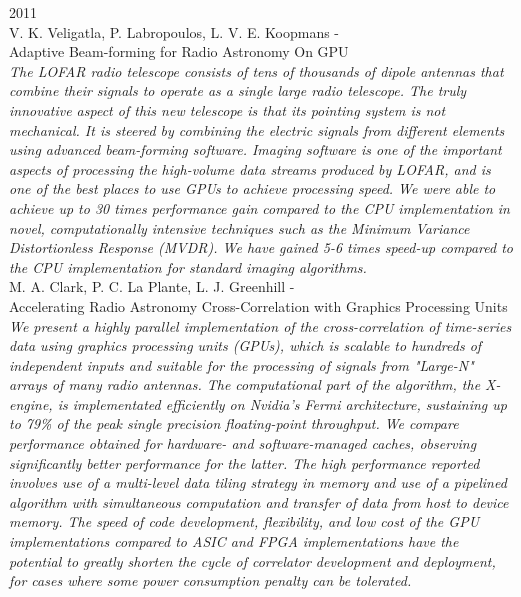 \noindent
{\large 2011}\\
\noindent
{\large V. K. Veligatla, P. Labropoulos, L. V. E. Koopmans - \hfill \\ Adaptive Beam-forming for Radio Astronomy On GPU }\\
\indent \textit{The LOFAR radio telescope consists of tens of thousands of dipole antennas that combine
their signals to operate as a single large radio telescope. The truly innovative aspect of
this new telescope is that its pointing system is not mechanical. It is steered by combining
the electric signals from different elements using advanced beam-forming software. Imaging
software is one of the important aspects of processing the high-volume data streams
produced by LOFAR, and is one of the best places to use GPUs to achieve processing
speed. We were able to achieve up to 30 times performance gain compared to the CPU
implementation in novel, computationally intensive techniques such as the Minimum Variance
Distortionless Response (MVDR). We have gained 5-6 times speed-up compared to
the CPU implementation for standard imaging algorithms.
}\\

\noindent
{\large M. A. Clark, P. C. La Plante, L. J. Greenhill - \hfill \\ Accelerating Radio Astronomy Cross-Correlation with Graphics Processing Units }\\
\indent \textit{We present a highly parallel implementation of the cross-correlation of time-series data using graphics processing units (GPUs), which is scalable to hundreds of independent inputs and suitable for the processing of signals from "Large-N" arrays of many radio antennas. The computational part of the algorithm, the X-engine, is implementated efficiently on Nvidia's Fermi architecture, sustaining up to 79\% of the peak single precision floating-point throughput. We compare performance obtained for hardware- and software-managed caches, observing significantly better performance for the latter. The high performance reported involves use of a multi-level data tiling strategy in memory and use of a pipelined algorithm with simultaneous computation and transfer of data from host to device memory. The speed of code development, flexibility, and low cost of the GPU implementations compared to ASIC and FPGA implementations have the potential to greatly shorten the cycle of correlator development and deployment, for cases where some power consumption penalty can be tolerated.
}\\

